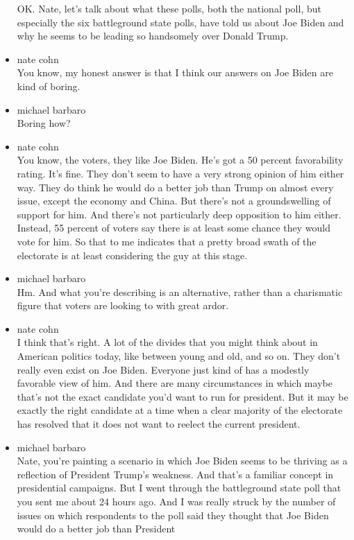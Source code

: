 \begin{itemize}
  OK. Nate, let's talk about what these polls, both the national poll,
  but especially the six battleground state polls, have told us about
  Joe Biden and why he seems to be leading so handsomely over Donald
  Trump.
\item
  nate cohn\\
  You know, my honest answer is that I think our answers on Joe Biden
  are kind of boring.
\item
  michael barbaro\\
  Boring how?
\item
  nate cohn\\
  You know, the voters, they like Joe Biden. He's got a 50 percent
  favorability rating. It's fine. They don't seem to have a very strong
  opinion of him either way. They do think he would do a better job than
  Trump on almost every issue, except the economy and China. But there's
  not a groundswelling of support for him. And there's not particularly
  deep opposition to him either. Instead, 55 percent of voters say there
  is at least some chance they would vote for him. So that to me
  indicates that a pretty broad swath of the electorate is at least
  considering the guy at this stage.
\item
  michael barbaro\\
  Hm. And what you're describing is an alternative, rather than a
  charismatic figure that voters are looking to with great ardor.
\item
  nate cohn\\
  I think that's right. A lot of the divides that you might think about
  in American politics today, like between young and old, and so on.
  They don't really even exist on Joe Biden. Everyone just kind of has a
  modestly favorable view of him. And there are many circumstances in
  which maybe that's not the exact candidate you'd want to run for
  president. But it may be exactly the right candidate at a time when a
  clear majority of the electorate has resolved that it does not want to
  reelect the current president.
\item
  michael barbaro\\
  Nate, you're painting a scenario in which Joe Biden seems to be
  thriving as a reflection of President Trump's weakness. And that's a
  familiar concept in presidential campaigns. But I went through the
  battleground state poll that you sent me about 24 hours ago. And I was
  really struck by the number of issues on which respondents to the poll
  said they thought that Joe Biden would do a better job than President

\end{itemize}
